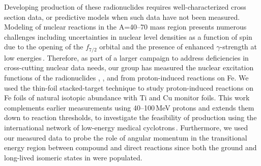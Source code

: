 Developing production of these radionuclides requires well-characterized cross section data, or predictive models when such data have not been measured.   
Modeling of nuclear reactions in 
the A=40--70 mass region presents numerous challenges including uncertainties in nuclear level densities as a function of spin due to the opening of the $f_{7/2}$ orbital and the presence of enhanced $\gamma$-strength at low energies\,\cite{Voinov2004a,Algin2008,Algin2007}.  
Therefore, as part of a larger campaign to address deficiencies in cross-cutting nuclear data needs, our group has
measured the   nuclear excitation functions of the radionuclides ,   , and  from proton-induced reactions on Fe.
We used the thin-foil stacked-target technique to study proton-induced reactions on 
Fe foils of natural isotopic abundance with 
Ti and 
Cu monitor foils.
This work 
complements 
earlier measurements using 40--100\,MeV protons  and extends them down to reaction thresholds,  to investigate the feasibility of production using the international network   of low-energy medical cyclotrons\,\cite{Graves2016}. 
Furthermore, 
we used our measured data to probe the role of angular momentum in the transitional energy region between compound and direct reactions since both the ground and long-lived isomeric states in  were populated.  









